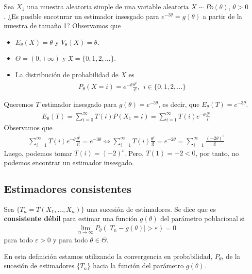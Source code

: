 \begin{ejemplo}
    Sea $X_1$ una muestra aleatoria simple de una variable aleatoria $X \sim Po(\theta)$, $\theta > 0$. ¿Es posible encotnrar un estimador insesgado para $e^{-3\theta} = g(\theta)$ a partir de la muestra de tamaño 1? Observamos que
    \begin{itemize}
        \item $E_{\theta}(X) = \theta$ y $V_{\theta}(X) = \theta$.
        \item $\Theta = (0,+\infty)$ y $\mathfrak{X} = \{0,1,2,...\}$.
        \item La distribución de probabilidad de $X$ es
              \begin{align*}
                  P_{\theta}(X = i) = e^{-\theta} \frac{\theta^i}{i!}, \ \ i \in \{0,1,2,...\}
              \end{align*}
    \end{itemize}
    Queremos $T$ estimador insesgado para $g(\theta) = e^{-3\theta}$, es decir, que $E_{\theta}(T) = e^{-3\theta}$.
    \begin{align*}
        E_{\theta}(T) = \sum_{i=0}^{\infty}{T(i)P(X_1 = i)} = \sum_{i=1}^{\infty}{T(i)e^{-\theta} \frac{\theta^i}{i!}}
    \end{align*}
    Observamos que
    \begin{align*}
        \sum_{i=1}^{\infty}{T(i)e^{-\theta} \frac{\theta^i}{i!}} = e^{-3\theta} \Longleftrightarrow  \sum_{i=1}^{\infty}{T(i)\frac{\theta^i}{i!}} = e^{-2\theta} = \sum_{i=1}^{\infty}{\frac{(-2\theta)^i}{i!}}
    \end{align*}
    Luego, podemos tomar $T(i) = (-2)^i$. Pero, $T(1) = -2 < 0$, por tanto, no podemos encontrar un estimador insesgado.
\end{ejemplo}

\subsection{Estimadores consistentes}

\begin{defi}
    Sea $\{T_n = T(X_1,...,X_n)\}$ una sucesión de estimadores. Se dice que es \textbf{consistente débil} para estimar una función $g(\theta)$ del parámetro poblacional si
    \begin{align*}
        \lim_{n \to \infty}{P_{\theta}(|T_n - g(\theta)| > \varepsilon)} = 0
    \end{align*}
    para todo $\varepsilon > 0$ y para todo $\theta \in \Theta$.
\end{defi}
En esta definición estamos utilizando la convergencia en probabilidad, $P_{\theta}$, de la sucesión de estimadores $\{T_n\}$ hacia la función del parámetro $g(\theta)$.

